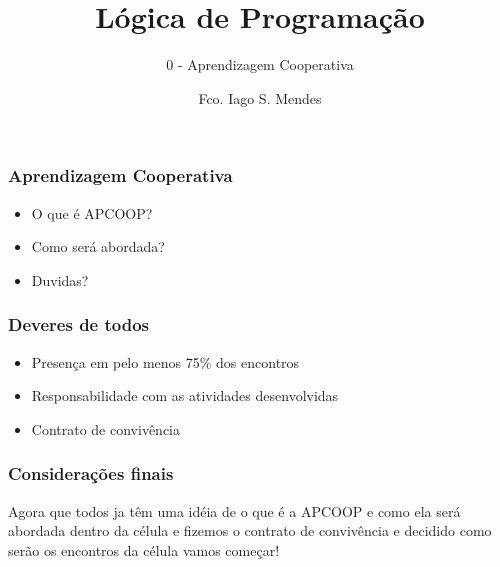 \documentclass[pdf]{beamer}
\title{Lógica de Programação}
\subtitle{0 - Aprendizagem Cooperativa}
\author{Fco. Iago S. Mendes}
\begin{document}
\begin{frame}
	\titlepage
\end{frame}

\begin{frame}
	\frametitle{Aprendizagem Cooperativa}
	\pause
	\begin{itemize}
		\item O que é APCOOP?
		\pause
		\item Como será abordada?
		\pause
		\item Duvidas?
	\end{itemize}
\end{frame}

\begin{frame}
	\frametitle{Deveres de todos}
	\pause
	\begin{itemize}
	\item Presença em pelo menos 75\% dos encontros
	\pause
	\item Responsabilidade com as atividades desenvolvidas
	\pause
	\item Contrato de convivência
	\end{itemize}
\end{frame}

\begin{frame}
    \frametitle{Considerações finais}
    Agora que todos ja têm uma idéia de o que é a APCOOP e como ela será abordada dentro da célula e fizemos o contrato de convivência e decidido como serão os encontros da célula vamos começar!
\end{frame}
\end{document}
